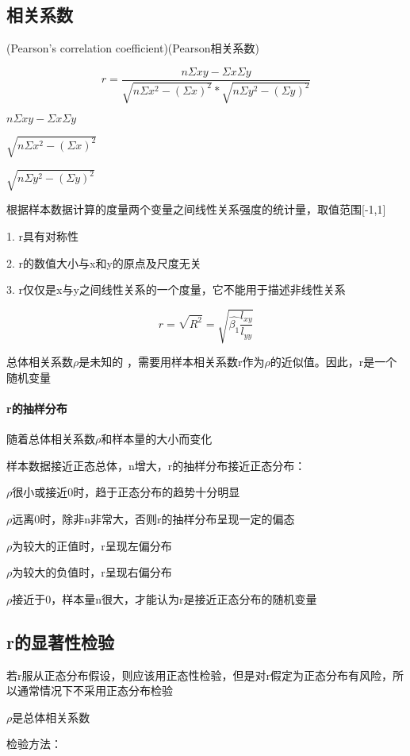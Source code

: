 \documentclass[UTF8,10pt]{book}
\begin{document}
\subsection{相关系数}
    (Pearson's correlation coefficient)(Pearson相关系数)	

    $$ r = \frac{n \Sigma xy -\Sigma x \Sigma y }{\sqrt{n \Sigma x^2 - \left( \Sigma x \right)^2} * \sqrt{n \Sigma y^2 - \left( \Sigma y \right)^2} } $$ 

    $ n \Sigma xy -\Sigma x \Sigma y $ 

    $ \sqrt{n \Sigma x^2 - \left( \Sigma x \right)^2} $ 

    $ \sqrt{n \Sigma y^2 - \left( \Sigma y \right)^2} $ 

    根据样本数据计算的度量两个变量之间线性关系强度的统计量，取值范围[-1,1]

    1. r具有对称性

    2. r的数值大小与x和y的原点及尺度无关

    3. r仅仅是x与y之间线性关系的一个度量，它不能用于描述非线性关系 

    $$ r = \sqrt{R^2}=\sqrt{\hat{\beta_1} \frac{l_{xy}}{l_{yy}}} $$

    总体相关系数$\rho$是未知的 ，需要用样本相关系数r作为$\rho$的近似值。因此，r是一个随机变量

\paragraph{r的抽样分布} 随着总体相关系数$\rho$和样本量的大小而变化	

    样本数据接近正态总体，n增大，r的抽样分布接近正态分布：

    $\rho$很小或接近0时，趋于正态分布的趋势十分明显

    $\rho$远离0时，除非n非常大，否则r的抽样分布呈现一定的偏态 

    $\rho$为较大的正值时，r呈现左偏分布 

    $\rho$为较大的负值时，r呈现右偏分布 

    $\rho$接近于0，样本量n很大，才能认为r是接近正态分布的随机变量

\subsection{r的显著性检验}	
若r服从正态分布假设，则应该用正态性检验，但是对r假定为正态分布有风险，所以通常情况下不采用正态分布检验 

$\rho$是总体相关系数 

检验方法：
\end{document}
